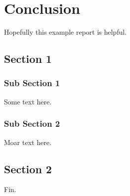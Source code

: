 \chapter{Conclusion}

Hopefully this example report is helpful.

\section{Section 1}

\subsection{Sub Section 1}

Some text here.

\subsection{Sub Section 2}

Moar text here.

\section{Section 2}

Fin.